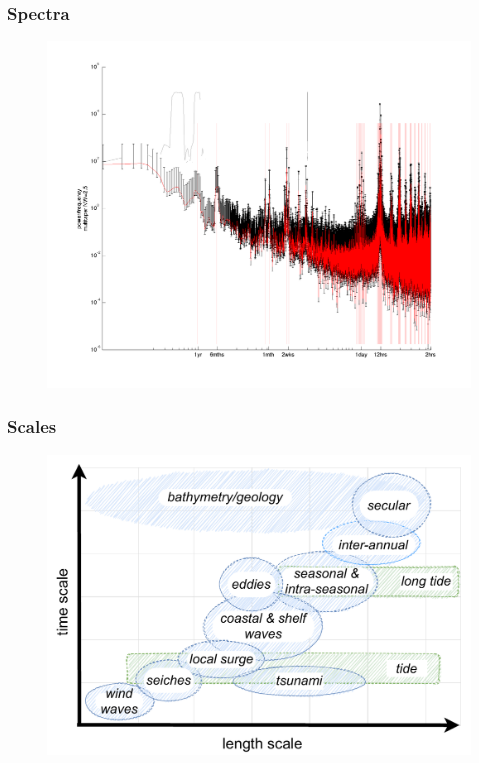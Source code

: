 \begin{frame}
\frametitle{Spectra}
\begin{minipage}{1.0\textwidth}
    \begin{figure}      
    \includegraphics[height=\textheight]{figures/plots/sealevel_spectra.png}
    \end{figure}
\end{minipage}
\hfill
\end{frame}
\begin{frame}
\frametitle{Scales}
    \begin{figure}      
    \includegraphics[height=\textheight]{figures/diagrams/scales_time_length.pdf}
    \end{figure}
\end{frame}

